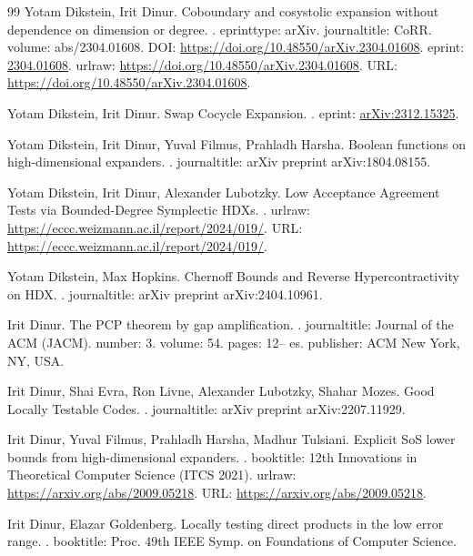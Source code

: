 \begin{thebibliography}{99}
Yotam Dikstein, Irit Dinur.
\newblock Coboundary and cosystolic expansion without dependence on dimension or degree.
.
\newblock eprinttype: arXiv.
\newblock journaltitle: CoRR.
\newblock volume: abs/2304.01608.
\newblock DOI: \url{https://doi.org/10.48550/arXiv.2304.01608}.
\newblock eprint: \url{2304.01608}.
\newblock urlraw: \url{https://doi.org/10.48550/arXiv.2304.01608}.
\newblock URL: \url{https://doi.org/10.48550/arXiv.2304.01608}.

Yotam Dikstein, Irit Dinur.
\newblock Swap Cocycle Expansion.
.
\newblock eprint: \url{arXiv:2312.15325}.

Yotam Dikstein, Irit Dinur, Yuval Filmus, Prahladh Harsha.
\newblock Boolean functions on high-dimensional expanders.
.
\newblock journaltitle: arXiv preprint arXiv:1804.08155.

Yotam Dikstein, Irit Dinur, Alexander Lubotzky.
\newblock Low Acceptance Agreement Tests via Bounded-Degree Symplectic HDXs.
.
\newblock urlraw: \url{https://eccc.weizmann.ac.il/report/2024/019/}.
\newblock URL: \url{https://eccc.weizmann.ac.il/report/2024/019/}.

Yotam Dikstein, Max Hopkins.
\newblock Chernoff Bounds and Reverse Hypercontractivity on HDX.
.
\newblock journaltitle: arXiv preprint arXiv:2404.10961.

Irit Dinur.
\newblock The PCP theorem by gap amplification.
.
\newblock journaltitle: Journal of the ACM (JACM).
\newblock number: 3.
\newblock volume: 54.
\newblock pages: 12-- es.
\newblock publisher: ACM New York, NY, USA.

Irit Dinur, Shai Evra, Ron Livne, Alexander Lubotzky, Shahar Mozes.
\newblock Good Locally Testable Codes.
.
\newblock journaltitle: arXiv preprint arXiv:2207.11929.

Irit Dinur, Yuval Filmus, Prahladh Harsha, Madhur Tulsiani.
\newblock Explicit SoS lower bounds from high-dimensional expanders.
.
\newblock booktitle: 12th Innovations in Theoretical Computer Science (ITCS 2021).
\newblock urlraw: \url{https://arxiv.org/abs/2009.05218}.
\newblock URL: \url{https://arxiv.org/abs/2009.05218}.

Irit Dinur, Elazar Goldenberg.
\newblock Locally testing direct products in the low error range.
.
\newblock booktitle: Proc. 49th IEEE Symp. on Foundations of Computer Science.


\end{thebibliography}
